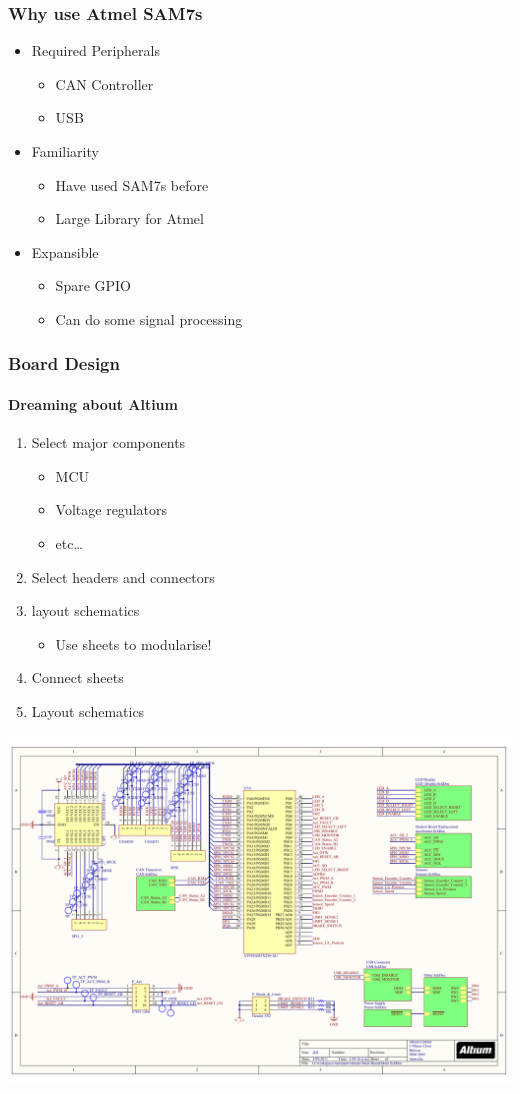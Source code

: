 \documentclass{beamer}
\begin{document}
\begin{frame}
\frametitle{Why use Atmel SAM7s}
\begin{itemize}
\item Required Peripherals 
  \begin{itemize}
  \item CAN Controller
  \item USB
  \end{itemize}
\item Familiarity
  \begin{itemize}
  \item Have used SAM7s before
  \item Large Library for Atmel
  \end{itemize}
\item Expansible
  \begin{itemize}
  \item Spare GPIO
  \item Can do some signal processing
  \end{itemize}
\end{itemize}
\end{frame}

\begin{frame}
\frametitle{Board Design}
\framesubtitle{Dreaming about Altium}
\begin{enumerate}
\item Select major components
  \begin{itemize}
  \item MCU
  \item Voltage regulators
  \item etc\ldots
  \end{itemize}
\item Select headers and connectors
\item layout schematics
  \begin{itemize}
  \item Use sheets to modularise!
  \end{itemize}
\item Connect sheets
\item Layout schematics
\end{enumerate}
\end{frame}

\begin{frame}
    \begin{center}
      \includegraphics[width=1.0\textwidth]{Images/Schematic}
    \end{center}
\end{frame}
\end{document}
